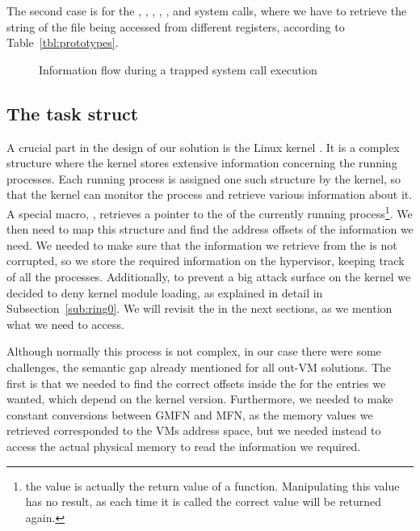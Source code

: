 \par The second case is for the , , , , , and  system calls, where we have to retrieve the string of the file being accessed from different registers, according to Table~\ref{tbl:prototypes}. 

\begin{figure}[ht]
	\centering
	
	\caption{Information flow during a trapped system call execution}
	\label{fig:overview}
\end{figure}


\subsection{The task struct}\label{sub:struct}
A crucial part in the design of our solution is the Linux kernel . It is a complex structure where the kernel stores extensive information concerning the running processes. Each running process is assigned one such structure by the kernel, so that the kernel can monitor the process and retrieve various information about it. A special macro, , retrieves a pointer to the  of the currently running process\footnote{the value is actually the return value of a function. Manipulating this value has no result, as each time it is called the correct value will be returned again. }. We then need to map this structure and find the address offsets of the information we need. We needed to make sure that the information we retrieve from the  is not corrupted, so we store the required information on the hypervisor, keeping track of all the processes. Additionally, to prevent a big attack surface on the kernel we decided to deny kernel module loading, as explained in detail in Subsection~\ref{sub:ring0}. We will revisit the  in the next sections, as we mention what we need to access.

\par Although normally this process is not complex, in our case there were some challenges, the semantic gap already mentioned for all out-\ac{VM} solutions. The first is that we needed to find the correct offsets inside the  for the entries we wanted, which depend on the kernel version. Furthermore, we needed to make constant conversions between \ac{GMFN} and \ac{MFN}, as the memory values we retrieved corresponded to the \ac{VM}s address space, but we needed instead to access the actual physical memory to read the information we required.


